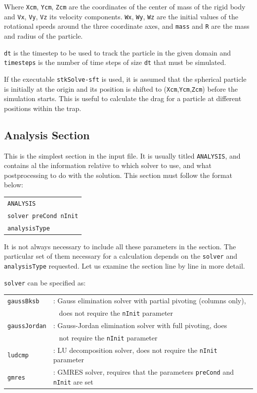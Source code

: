 \documentclass[12pt]{article}
\begin{document}
Where \verb+Xcm+, \verb+Ycm+, \verb+Zcm+ are the coordinates of the center of mass of the rigid body and \verb+Vx+, \verb+Vy+, \verb+Vz+ its velocity components. \verb+Wx+, \verb+Wy+, \verb+Wz+ are the initial values of the rotational speeds around the three coordinate axes, and \verb+mass+ and \verb+R+ are the mass and radius of the particle.

\verb+dt+ is the timestep to be used to track the particle in the given domain and \verb+timesteps+ is the number of time steps of size \verb+dt+ that must be simulated.

If the executable \verb+stkSolve-sft+ is used, it is assumed that the spherical particle is initially at the origin and its position is shifted to (\verb+Xcm+,\verb+Ycm+,\verb+Zcm+) before the simulation starts. This is useful to calculate the drag for a particle at different positions within the trap.

\subsection{Analysis Section}
This is the simplest section in the input file. It is usually titled \verb+ANALYSIS+, and contains al the information relative to which solver to use, and what postprocessing to do with the solution. This section must follow the format below:

\begin{tabular}{l}
\texttt{ANALYSIS}\\
\texttt{solver preCond nInit}\\
\texttt{analysisType}\\
\end{tabular}

It is not always necessary to include all these parameters in the section. The particular set of them necessary for a calculation depends on the \verb+solver+ and \verb+analysisType+ requested. Let us examine the section line by line in more detail.

\verb+solver+ can be specified as:

\begin{tabular}{ll}
\texttt{gaussBksb}&: Gauss elimination solver with partial pivoting (columns only),\\
  & \verb+ + does not require the \texttt{nInit} parameter\\
\texttt{gaussJordan}&: Gauss-Jordan elimination solver with full pivoting, does \\
  & \verb+ + not require the \texttt{nInit} parameter\\
\texttt{ludcmp}&: LU decomposition solver, does not require the \texttt{nInit} parameter\\
\texttt{gmres}&: GMRES solver, requires that the parameters \texttt{preCond} and \texttt{nInit} are set
\end{tabular}
\end{document}
